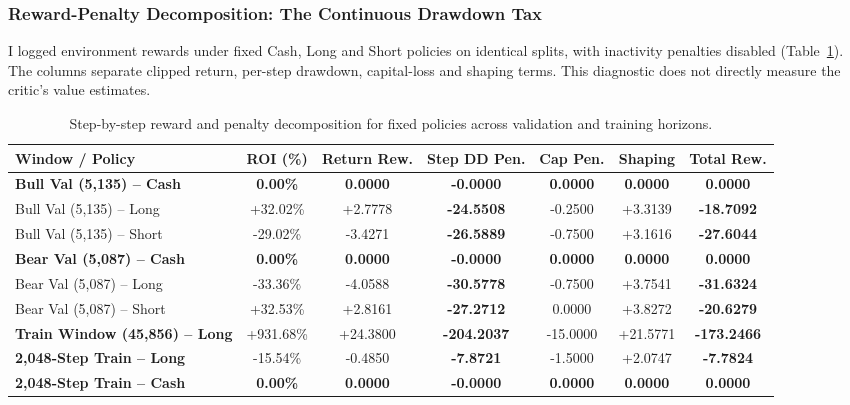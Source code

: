 \documentclass[11pt,a4paper]{article}
\begin{document}
\subsubsection{Reward-Penalty Decomposition: The Continuous Drawdown Tax}
I logged environment rewards under fixed Cash, Long and Short policies on identical splits, with inactivity penalties disabled (Table~\ref{tab:reward_decomposition}). The columns separate clipped return, per-step drawdown, capital-loss and shaping terms. This diagnostic does not directly measure the critic's value estimates.

\begin{table}[H]
\centering
\footnotesize
\begin{tabularx}{\textwidth}{p{3.2cm} c c c c c c}
\toprule
\textbf{Window / Policy} & \textbf{ROI (\%)} & \textbf{Return Rew.} & \textbf{Step DD Pen.} & \textbf{Cap Pen.} & \textbf{Shaping} & \textbf{Total Rew.} \\
\midrule
\textbf{Bull Val (5,135) -- Cash} & \textbf{0.00\%} & \textbf{0.0000} & \textbf{-0.0000} & \textbf{0.0000} & \textbf{0.0000} & \textbf{0.0000} \\
Bull Val (5,135) -- Long & +32.02\% & +2.7778 & \textbf{-24.5508} & -0.2500 & +3.3139 & \textbf{-18.7092} \\
Bull Val (5,135) -- Short & -29.02\% & -3.4271 & \textbf{-26.5889} & -0.7500 & +3.1616 & \textbf{-27.6044} \\
\midrule
\textbf{Bear Val (5,087) -- Cash} & \textbf{0.00\%} & \textbf{0.0000} & \textbf{-0.0000} & \textbf{0.0000} & \textbf{0.0000} & \textbf{0.0000} \\
Bear Val (5,087) -- Long & -33.36\% & -4.0588 & \textbf{-30.5778} & -0.7500 & +3.7541 & \textbf{-31.6324} \\
Bear Val (5,087) -- Short & +32.53\% & +2.8161 & \textbf{-27.2712} & 0.0000 & +3.8272 & \textbf{-20.6279} \\
\midrule
\textbf{Train Window (45,856) -- Long} & +931.68\% & +24.3800 & \textbf{-204.2037} & -15.0000 & +21.5771 & \textbf{-173.2466} \\
\textbf{2,048-Step Train -- Long} & -15.54\% & -0.4850 & \textbf{-7.8721} & -1.5000 & +2.0747 & \textbf{-7.7824} \\
\textbf{2,048-Step Train -- Cash} & \textbf{0.00\%} & \textbf{0.0000} & \textbf{-0.0000} & \textbf{0.0000} & \textbf{0.0000} & \textbf{0.0000} \\
\bottomrule
\end{tabularx}
\caption{Step-by-step reward and penalty decomposition for fixed policies across validation and training horizons.}
\label{tab:reward_decomposition}
\end{table}
\end{document}
